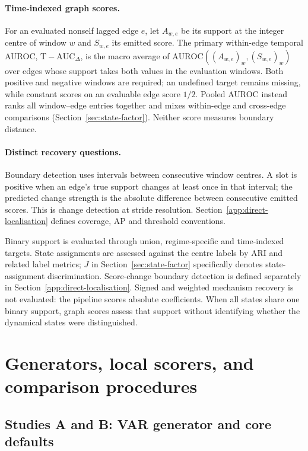 \documentclass[11pt]{article}
\begin{document}
\paragraph{Time-indexed graph scores.}
For an evaluated nonself lagged edge $e$, let $A_{w,e}$ be its support at the
integer centre of window $w$ and $S_{w,e}$ its emitted score. The primary
within-edge temporal AUROC, $\mathrm{T\!-\!AUC}_{\Delta}$, is the macro average
of $\mathrm{AUROC}((A_{w,e})_w,(S_{w,e})_w)$ over edges whose support takes both
values in the evaluation windows. Both positive and negative windows are
required; an undefined target remains missing, while constant scores on an
evaluable edge score $1/2$. Pooled AUROC instead ranks all window--edge entries
together and mixes within-edge and cross-edge comparisons
(Section~\ref{sec:state-factor}). Neither score measures boundary distance.

\paragraph{Distinct recovery questions.}
Boundary detection uses intervals between consecutive window centres. A slot
is positive when an edge's true support changes at least once in that interval;
the predicted change strength is the absolute difference between consecutive
emitted scores. This is change detection at stride resolution. Section~\ref{app:direct-localisation}
defines coverage, AP and threshold conventions.

Binary support is evaluated through union, regime-specific and time-indexed
targets. State assignments are assessed against the centre labels by ARI and
related label metrics; $J$ in Section~\ref{sec:state-factor} specifically denotes
state-assignment discrimination. Score-change boundary detection is defined
separately in Section~\ref{app:direct-localisation}. Signed and weighted mechanism
recovery is not evaluated: the pipeline scores absolute coefficients.
When all states share one binary support, graph scores assess that support
without identifying whether the dynamical states were distinguished.

\FloatBarrier
\section{Generators, local scorers, and comparison procedures}
\label{supp:procedures}

\subsection{Studies A and B: VAR generator and core defaults}
\label{app:config}
\end{document}
